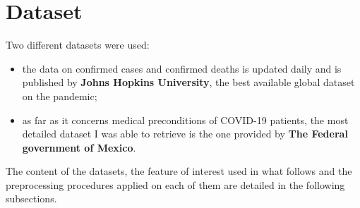 \documentclass[11pt,a4paper]{article}
\begin{document}
\section{Dataset}
Two different datasets were used:
\begin{itemize}
    \item the data on confirmed cases and confirmed deaths is updated daily and
    is published by \textbf{Johns Hopkins University}, the best available global
    dataset on the pandemic;
    \item as far as it concerns medical preconditions of COVID-19 patients,
    the most detailed dataset I was able to retrieve is the one provided by
    \textbf{The Federal government of Mexico}.
\end{itemize}
The content of the datasets, the feature of interest used in what follows and
the preprocessing procedures applied on each of them are detailed in the
following subsections.
\end{document}
